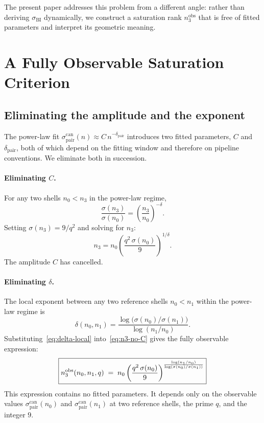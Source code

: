 \documentclass[11pt,a4paper]{article}
\theoremstyle{definition}
\theoremstyle{remark}
\begin{document}
    The present paper addresses this problem from a different
    angle: rather than deriving $\sigma_{\mathrm{BI}}$
    dynamically, we construct a saturation rank
    $n_3^{\mathrm{obs}}$ that is free of fitted parameters and
    interpret its geometric meaning.

  \section{A Fully Observable Saturation Criterion}
  \label{sec:observable-criterion}

  \subsection{Eliminating the amplitude and the exponent}

    The power-law fit
    $\sigma_{\mathrm{pair}}^{\mathrm{can}}(n) \approx
    C\,n^{-\delta_{\mathrm{pair}}}$ introduces two fitted
    parameters, $C$ and $\delta_{\mathrm{pair}}$, both of which
    depend on the fitting window and therefore on pipeline
    conventions.
    We eliminate both in succession.

    \paragraph{Eliminating $C$.}
      For any two shells $n_0 < n_3$ in the power-law regime,
      \[
        \frac{\sigma(n_3)}{\sigma(n_0)}
        = \left(\frac{n_3}{n_0}\right)^{-\delta}.
      \]
      Setting $\sigma(n_3) = 9/q^2$ and solving for $n_3$:
      \begin{equation}
        \label{eq:n3-no-C}
        n_3
        = n_0 \left(\frac{q^2\,\sigma(n_0)}{9}\right)^{1/\delta}.
      \end{equation}
      The amplitude $C$ has cancelled.

    \paragraph{Eliminating $\delta$.}
      The local exponent between any two reference shells
      $n_0 < n_1$ within the power-law regime is
      \begin{equation}
        \label{eq:delta-local}
        \delta(n_0, n_1)
        = \frac{\log\bigl(\sigma(n_0)/\sigma(n_1)\bigr)}
        {\log(n_1/n_0)}.
      \end{equation}
      Substituting~\eqref{eq:delta-local}
      into~\eqref{eq:n3-no-C} gives the fully observable
      expression:
      \begin{equation}
        \label{eq:n3-observable}
        \boxed{
          n_3^{\mathrm{obs}}(n_0, n_1, q)
          \;=\;
          n_0
          \left(\frac{q^2\,\sigma(n_0)}{9}\right)^{%
            \frac{\log(n_1/n_0)}{\log(\sigma(n_0)/\sigma(n_1))}}
        }
      \end{equation}
      This expression contains no fitted parameters.
      It depends only on the observable values
      $\sigma_{\mathrm{pair}}^{\mathrm{can}}(n_0)$ and
      $\sigma_{\mathrm{pair}}^{\mathrm{can}}(n_1)$ at two reference
      shells, the prime $q$, and the integer $9$.
\end{document}
